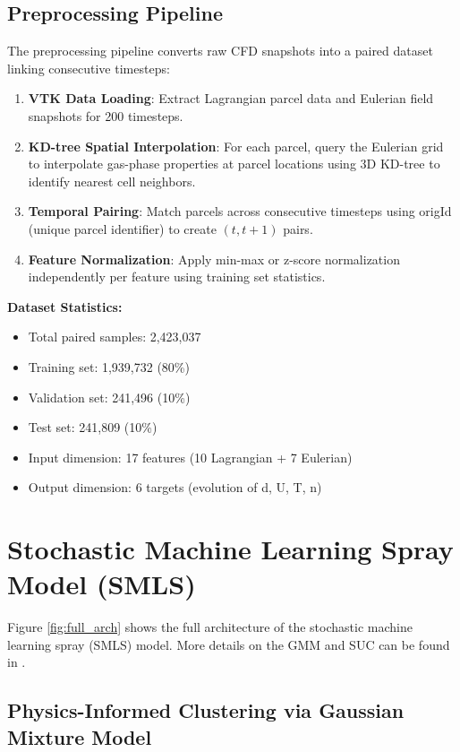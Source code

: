 \documentclass[letterpaper,twocolumn,10pt]{article}
\begin{document}
\subsection{Preprocessing Pipeline}

The preprocessing pipeline converts raw CFD snapshots into a paired dataset linking consecutive timesteps:

\begin{enumerate}
    \item \textbf{VTK Data Loading}: Extract Lagrangian parcel data and Eulerian field snapshots for 200 timesteps.
    \item \textbf{KD-tree Spatial Interpolation}: For each parcel, query the Eulerian grid to interpolate gas-phase properties at parcel locations using 3D KD-tree to identify nearest cell neighbors.
    \item \textbf{Temporal Pairing}: Match parcels across consecutive timesteps using origId (unique parcel identifier) to create $(t, t+1)$ pairs.
    \item \textbf{Feature Normalization}: Apply min-max or z-score normalization independently per feature using training set statistics.
\end{enumerate}

\textbf{Dataset Statistics:}
\begin{itemize}
    \item Total paired samples: 2,423,037
    \item Training set: 1,939,732 (80\%)
    \item Validation set: 241,496 (10\%)
    \item Test set: 241,809 (10\%)
    \item Input dimension: 17 features (10 Lagrangian + 7 Eulerian)
    \item Output dimension: 6 targets (evolution of d, U, T, n)
\end{itemize}

\section{Stochastic Machine Learning Spray Model (SMLS)}
Figure \ref{fig:full_arch} shows the full architecture of the stochastic machine learning spray (SMLS) model. More details on the GMM and SUC can be found in \cite{Mishra2023}.
\subsection{Physics-Informed Clustering via Gaussian Mixture Model}
\end{document}
